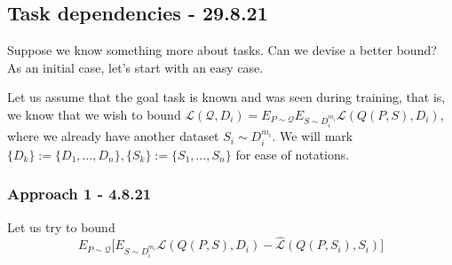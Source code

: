 \documentclass[letterpaper]{article}
\theoremstyle{definition}
\begin{document}




	

\subsection{Task dependencies - 29.8.21} \label{sec:bayes:dependencies}

Suppose we know something more about tasks. Can we devise a better bound?
As an initial case, let's start with an easy case.

Let us assume that the goal task is known and was seen during training, that is, we know that we wish to bound $\mathcal{L}(\mathcal{Q}, D_i)=E_{P\sim \mathcal{Q}}E_{S\sim D_i^{m_i}}\mathcal{L}(Q(P, S), D_i)$, where we already have another dataset $S_i\sim D_i^{m_i}$. We will mark $\{D_k\}:=\{D_1,...,D_n\}, \{S_k\}:=\{S_1,...,S_n\}$ for ease of notations.

\subsubsection*{Approach 1 - 4.8.21}
Let us try to bound
$$E_{P\sim \mathcal{Q}}\bigl [E_{S\sim D_i^{m_i}}\mathcal{L}(Q(P, S), D_i)-\hat{\mathcal{L}}(Q(P, S_i), S_i)\bigr ]$$
\end{document}
